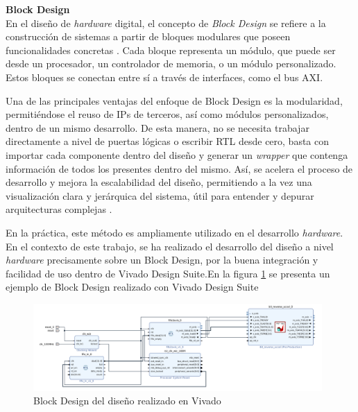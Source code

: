 \begin{adjustwidth}{1.5cm}{}
\textbf{Block Design} \vspace{0.25cm} \\
En el diseño de \textit{hardware} digital, el concepto de \emph{Block Design} se refiere a la construcción de sistemas a partir de bloques modulares que poseen funcionalidades concretas \cite{infoBlockDesign}. Cada bloque representa un módulo, que puede ser desde un procesador, un controlador de memoria, o un módulo personalizado. Estos bloques se conectan entre sí a través de interfaces, como el bus \ac{AXI}. 

Una de las principales ventajas del enfoque de Block Design es la modularidad, permitiéndose el reuso de IPs de terceros, así como módulos personalizados, dentro de un mismo desarrollo. De esta manera, no se necesita trabajar directamente a nivel de puertas lógicas o escribir RTL desde cero, basta con importar cada componente dentro del diseño y generar un \textit{wrapper} que contenga información de todos los presentes dentro del mismo. Así, se acelera el proceso de desarrollo y mejora la escalabilidad del diseño, permitiendo a la vez una visualización clara y jerárquica del sistema, útil para entender y depurar arquitecturas complejas \cite{infoBlockDesign} \cite{maxfield2004design}.

En la práctica, este método es ampliamente utilizado en el desarrollo \textit{hardware}. En el contexto de este trabajo, se ha realizado el desarrollo del diseño a nivel \textit{hardware} precisamente sobre un Block Design, por la buena integración y facilidad de uso dentro de Vivado Design Suite.En la figura \ref{fig:bdVivado} se presenta un ejemplo de Block Design realizado con Vivado Design Suite

\begin{figure}[!ht]
  \centering
  \includegraphics[width=11cm]{figures/vivadoBD.png}
  \caption{Block Design del diseño realizado en Vivado}
  \label{fig:bdVivado}
\end{figure}

\end{adjustwidth}

